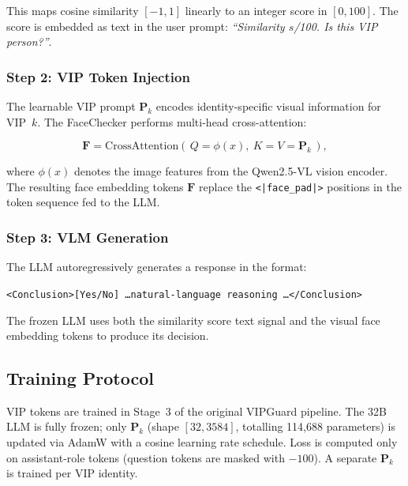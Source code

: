 \documentclass[12pt,a4paper]{article}
\begin{document}
This maps cosine similarity $[-1, 1]$ linearly to an integer score in $[0, 100]$.
The score is embedded as text in the user prompt: \emph{``Similarity $s$/100.
Is this VIP person?''}.

\subsubsection{Step 2: VIP Token Injection}

The learnable VIP prompt $\mathbf{P}_k$ encodes identity-specific visual
information for VIP~$k$.  The FaceChecker performs multi-head cross-attention:

\begin{equation}
  \mathbf{F} = \text{CrossAttention}(\,Q = \phi(x),\ K = V = \mathbf{P}_k\,),
  \label{eq:facechecker}
\end{equation}

where $\phi(x)$ denotes the image features from the Qwen2.5-VL vision encoder.
The resulting face embedding tokens $\mathbf{F}$ replace the
\texttt{<|face\_pad|>} positions in the token sequence fed to the LLM.

\subsubsection{Step 3: VLM Generation}

The LLM autoregressively generates a response in the format:

\begin{center}
\texttt{<Conclusion>[Yes/No] \ldots natural-language reasoning \ldots</Conclusion>}
\end{center}

The frozen LLM uses both the similarity score text signal and the visual face
embedding tokens to produce its decision.

\subsection{Training Protocol}

VIP tokens are trained in Stage~3 of the original VIPGuard pipeline.  The 32B
LLM is fully frozen; only $\mathbf{P}_k$ (shape $[32, 3584]$, totalling
114,688 parameters) is updated via AdamW with a cosine learning rate schedule.
Loss is computed only on assistant-role tokens (question tokens are masked with
$-100$).  A separate $\mathbf{P}_k$ is trained per VIP identity.

\end{document}
